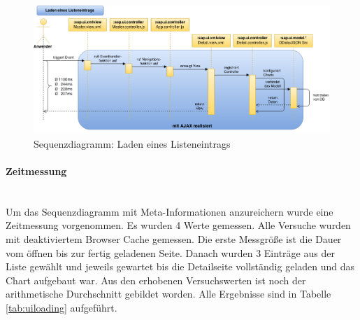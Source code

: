 \vspace{1em}
\begin{figure}[htb]
  \centering
  \includegraphics[width=1.05\linewidth,angle=90]{abb/sapui5_load_list_entry}
  \caption[Sequenzdiagramm: Laden eines Listeneintrags]{Sequenzdiagramm: Laden eines Listeneintrags}
  \label{fig:sapui5loadlistentry}
\end{figure}

\paragraph{Zeitmessung}$\;$ \\
Um das Sequenzdiagramm mit Meta-Informationen anzureichern wurde eine Zeitmessung vorgenommen. Es wurden 4 Werte gemessen. Alle Versuche wurden mit deaktiviertem Browser Cache gemessen. Die erste Messgröße ist die Dauer vom öffnen bis zur fertig geladenen Seite. Danach wurden 3 Einträge aus der Liste gewählt und jeweils gewartet bis die Detailseite vollständig geladen und das Chart aufgebaut war. Aus den erhobenen Versuchswerten ist noch der arithmetische Durchschnitt gebildet worden. Alle Ergebnisse sind in Tabelle \ref{tab:uiloading} aufgeführt.

